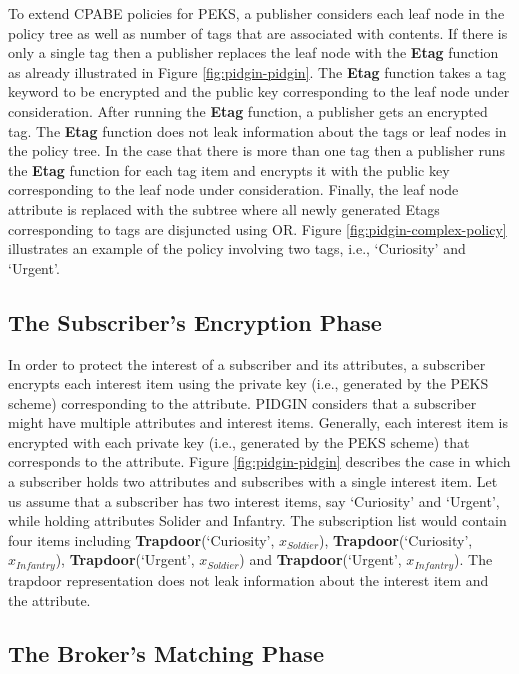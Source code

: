 \documentclass[epsfig,a4paper,11pt,titlepage]{book}
\numberwithin{algorithm}{chapter}
\begin{document}
To extend \gls{CPABE} policies for \gls{PEKS}, a publisher considers each leaf node in the policy tree as well as number of tags that are associated with contents. If there is only a single tag then a publisher replaces the leaf node with the \textbf{Etag} function as already illustrated in Figure \ref{fig:pidgin-pidgin}. The \textbf{Etag} function takes a tag keyword to be encrypted and the public key corresponding to the leaf node under consideration. After running the \textbf{Etag} function, a publisher gets an encrypted tag. The \textbf{Etag} function does not leak information about the tags or leaf nodes in the policy tree. In the case that there is more than one tag then a publisher runs the \textbf{Etag} function for each tag item and encrypts it with the public key corresponding to the leaf node under consideration. Finally, the leaf node attribute is replaced with the subtree where all newly generated Etags corresponding to tags are disjuncted using OR. Figure \ref{fig:pidgin-complex-policy} illustrates an example of the policy involving two tags, i.e., `Curiosity' and `Urgent'.


\subsection{The Subscriber's Encryption Phase}
In order to protect the interest of a subscriber and its attributes, a subscriber encrypts each interest item using the private key (i.e., generated by the \gls{PEKS} scheme) corresponding to the attribute. \gls{PIDGIN} considers that a subscriber might have multiple attributes and interest items. Generally, each interest item is encrypted with each private key (i.e., generated by the \gls{PEKS} scheme) that corresponds to the attribute. Figure \ref{fig:pidgin-pidgin} describes the case in which a subscriber holds two attributes and subscribes with a single interest item. Let us assume that a subscriber has two interest items, say `Curiosity' and `Urgent', while holding attributes Solider and Infantry. The subscription list would contain four items including \textbf{Trapdoor}(`Curiosity', $x_{Soldier}$), \textbf{Trapdoor}(`Curiosity', $x_{Infantry}$), \textbf{Trapdoor}(`Urgent', $x_{Soldier}$) and \textbf{Trapdoor}(`Urgent', $x_{Infantry}$). The trapdoor representation does not leak information about the interest item and the attribute.

\subsection{The Broker's Matching Phase}
\end{document}
